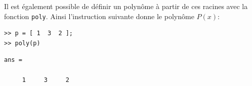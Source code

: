 Il est également possible de définir un polynôme à partir de ces racines avec 
la fonction \texttt{poly}. Ainsi l'instruction suivante donne le 
polynôme $P(x)$:
\begin{verbatim}
>> p = [ 1  3  2 ];
>> poly(p)
\end{verbatim}
\begin{verbatim}
ans =

     1     3     2
\end{verbatim}
